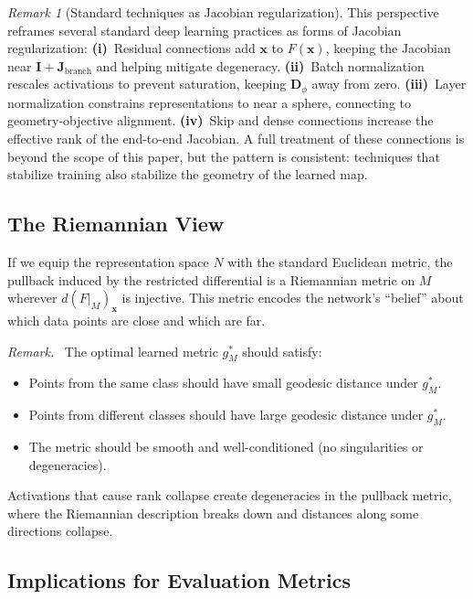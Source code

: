 \documentclass[11pt,a4paper]{article}
\theoremstyle{remark}
\newtheorem{remark}{Remark}
\newenvironment{geometricinsight}{\par\medskip\noindent\textit{Remark.}\ }{\par\medskip}
\begin{document}
\begin{remark}[Standard techniques as Jacobian regularization]
This perspective reframes several standard deep learning practices as forms of Jacobian regularization:
\textbf{(i)}~Residual connections add $\mathbf{x}$ to $F(\mathbf{x})$, keeping the Jacobian near $\mathbf{I} + \mathbf{J}_{\text{branch}}$ and helping mitigate degeneracy.
\textbf{(ii)}~Batch normalization rescales activations to prevent saturation, keeping $\mathbf{D}_\phi$ away from zero.
\textbf{(iii)}~Layer normalization constrains representations to near a sphere, connecting to geometry-objective alignment.
\textbf{(iv)}~Skip and dense connections increase the effective rank of the end-to-end Jacobian.
A full treatment of these connections is beyond the scope of this paper, but the pattern is consistent: techniques that stabilize training also stabilize the geometry of the learned map.
\end{remark}

\subsection{The Riemannian View}

If we equip the representation space $N$ with the standard Euclidean metric, the pullback induced by the restricted differential is a Riemannian metric on $M$ wherever $d(F|_M)_{\mathbf{x}}$ is injective.
This metric encodes the network's ``belief'' about which data points are close and which are far.

\begin{geometricinsight}
The optimal learned metric $g_M^*$ should satisfy:
\begin{itemize}
  \item Points from the same class should have small geodesic distance under $g_M^*$.
  \item Points from different classes should have large geodesic distance under $g_M^*$.
  \item The metric should be smooth and well-conditioned (no singularities or degeneracies).
\end{itemize}
Activations that cause rank collapse create degeneracies in the pullback metric, where the Riemannian description breaks down and distances along some directions collapse.
\end{geometricinsight}

\subsection{Implications for Evaluation Metrics}
\end{document}

